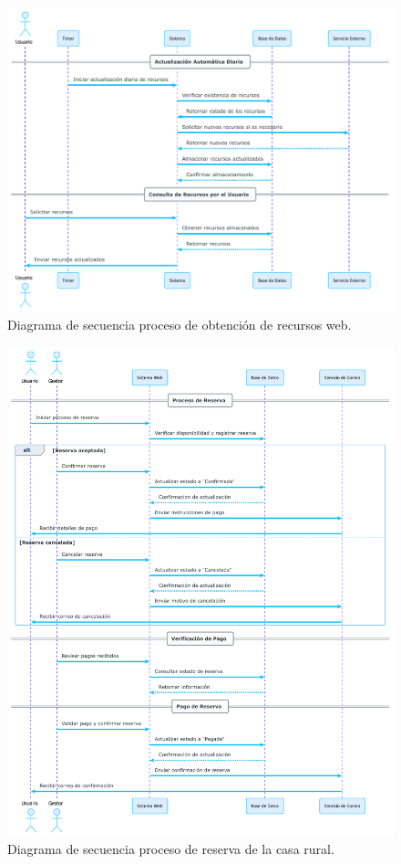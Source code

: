 \begin{figure}[h!tb]
    \centering
    
    \includegraphics [width=1\textwidth]{figs/recursos_alto.pdf}
    \caption{Diagrama de secuencia proceso de obtención de recursos web.\label{fig:secuencia_recursos}}
   
\end{figure}
 
\begin{figure}[h!tb]
    \centering
    
    \includegraphics [width=1\textwidth]{figs/reservas_alto.pdf}
    \caption{Diagrama de secuencia proceso de reserva de la casa rural.\label{fig:secuencia_reserva}}
   
\end{figure}

